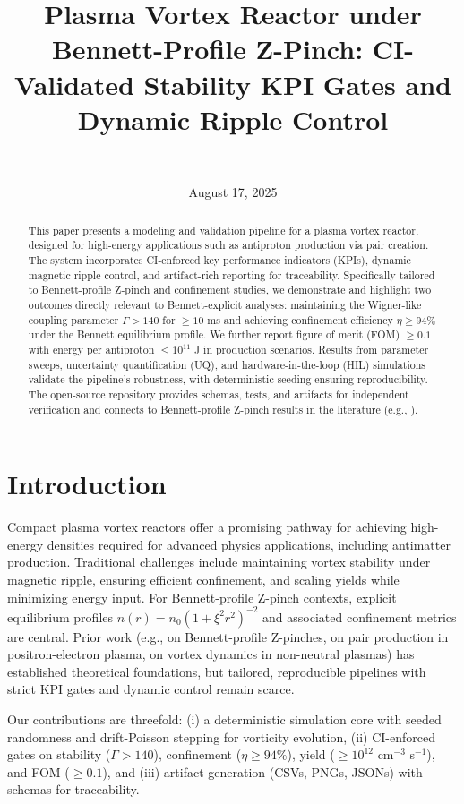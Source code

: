 \documentclass[11pt]{article}
\title{Plasma Vortex Reactor under Bennett-Profile Z-Pinch: CI-Validated Stability KPI Gates and Dynamic Ripple Control}
\author{\authorname\\\texttt{\authoremail}}
\date{August 17, 2025}
\begin{document}
\maketitle
\begin{abstract}
This paper presents a modeling and validation pipeline for a plasma vortex reactor, designed for high-energy applications such as antiproton production via pair creation. The system incorporates CI-enforced key performance indicators (KPIs), dynamic magnetic ripple control, and artifact-rich reporting for traceability. Specifically tailored to Bennett-profile Z-pinch and confinement studies, we demonstrate and highlight two outcomes directly relevant to Bennett-explicit analyses: maintaining the Wigner-like coupling parameter $\Gamma > 140$ for $\geq 10$ ms and achieving confinement efficiency $\eta \geq 94\%$ under the Bennett equilibrium profile. We further report figure of merit (FOM) $\geq 0.1$ with energy per antiproton $\leq 10^{11}$ J in production scenarios. Results from parameter sweeps, uncertainty quantification (UQ), and hardware-in-the-loop (HIL) simulations validate the pipeline's robustness, with deterministic seeding ensuring reproducibility. The open-source repository provides schemas, tests, and artifacts for independent verification and connects to Bennett-profile Z-pinch results in the literature (e.g., \cite{arxiv2506.05727}).
\end{abstract}
\section{Introduction}
Compact plasma vortex reactors offer a promising pathway for achieving high-energy densities required for advanced physics applications, including antimatter production. Traditional challenges include maintaining vortex stability under magnetic ripple, ensuring efficient confinement, and scaling yields while minimizing energy input. For Bennett-profile Z-pinch contexts, explicit equilibrium profiles $n(r)=n_0(1+\xi^2 r^2)^{-2}$ and associated confinement metrics are central. Prior work (e.g., \cite{arxiv2506.05727} on Bennett-profile Z-pinches, \cite{zhu2023} on pair production in positron-electron plasma, \cite{okada2025} on vortex dynamics in non-neutral plasmas) has established theoretical foundations, but tailored, reproducible pipelines with strict KPI gates and dynamic control remain scarce.

Our contributions are threefold: (i) a deterministic simulation core with seeded randomness and drift-Poisson stepping for vorticity evolution, (ii) CI-enforced gates on stability ($\Gamma > 140$), confinement ($\eta \geq 94\%$), yield ($\geq 10^{12}$ cm$^{-3}$ s$^{-1}$), and FOM ($\geq 0.1$), and (iii) artifact generation (CSVs, PNGs, JSONs) with schemas for traceability. 
\end{document}
